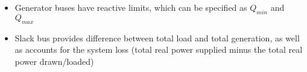 \begin{itemize}

  \item Generator buses have reactive limits, which can be specified as $Q_{min}$ and $Q_{max}$

  \item Slack bus provides difference between total load and total generation, as well as accounts for the system loss (total real power supplied minus the total real power drawn/loaded)

\end{itemize}



